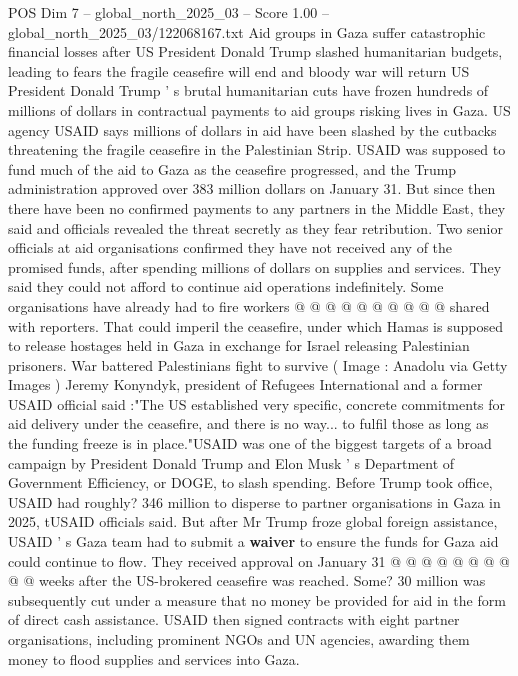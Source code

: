 \begin{textsample}{POS Dim 7 – global\_north\_2025\_03 – Score 1.00 – global\_north\_2025\_03/122068167.txt}  \label{ex:f7_pos_328}
Aid groups in Gaza suffer catastrophic financial losses after US President Donald Trump slashed humanitarian budgets, leading to fears the fragile ceasefire will end and bloody war will return US President Donald Trump ' s brutal humanitarian cuts have frozen hundreds of millions of dollars in contractual payments to aid groups risking lives in Gaza.
US agency USAID says millions of dollars in aid have been slashed by the cutbacks threatening the fragile ceasefire in the Palestinian Strip.
USAID was supposed to fund much of the aid to Gaza as the ceasefire progressed, and the Trump administration approved over 383 million dollars on January 31.
But since then there have been no confirmed payments to any partners in the Middle East, they said and officials revealed the threat secretly as they fear retribution.
Two senior officials at aid organisations confirmed they have not received any of the promised funds, after spending millions of dollars on supplies and services.
They said they could not afford to continue aid operations indefinitely.
Some organisations have already had to fire workers @ @ @ @ @ @ @ @ @ @ shared with reporters.
That could imperil the ceasefire, under which Hamas is supposed to release hostages held in Gaza in exchange for Israel releasing Palestinian prisoners.
War battered Palestinians fight to survive ( Image : Anadolu via Getty Images ) Jeremy Konyndyk, president of Refugees International and a former USAID official said :"The US established very specific, concrete commitments for aid delivery under the ceasefire, and there is no way... to fulfil those as long as the funding freeze is in place."USAID was one of the biggest targets of a broad campaign by President Donald Trump and Elon Musk ' s Department of Government Efficiency, or DOGE, to slash spending.
Before Trump took office, USAID had roughly? 346 million to disperse to partner organisations in Gaza in 2025, tUSAID officials said.
But after Mr Trump froze global foreign assistance, USAID ' s Gaza team had to submit a \textbf{waiver} to ensure the funds for Gaza aid could continue to flow.
They received approval on January 31 @ @ @ @ @ @ @ @ @ @ weeks after the US-brokered ceasefire was reached.
Some? 30 million was subsequently cut under a measure that no money be provided for aid in the form of direct cash assistance.
USAID then signed contracts with eight partner organisations, including prominent NGOs and UN agencies, awarding them money to flood supplies and services into Gaza.

\end{textsample}
